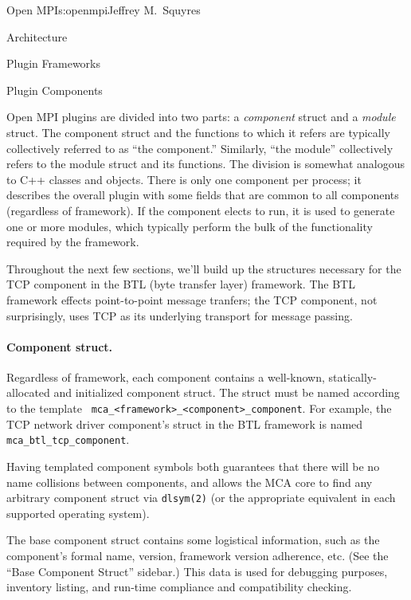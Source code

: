 \begin{aosachapter}{Open MPI}{s:openmpi}{Jeffrey M.\ Squyres}
\begin{aosasect1}{Architecture}
\begin{aosasect2}{Plugin Frameworks}
\end{aosasect2}


\begin{aosasect2}{Plugin Components}

Open MPI plugins are divided into two parts: a \emph{component}
struct and a \emph{module} struct.
%
The component struct and the functions to which it refers are
typically collectively referred to as ``the component.''  Similarly,
``the module'' collectively refers to the module struct and its
functions.
%
The division is somewhat analogous to C++ classes and objects.
%
There is only one component per process; it describes the overall
plugin with some fields that are common to all components (regardless
of framework).
%
If the component elects to run, it is used to generate one or more
modules, which typically perform the bulk of the functionality
required by the framework.

Throughout the next few sections, we'll build up the structures
necessary for the TCP component in the BTL (byte transfer layer)
framework.  The BTL framework effects point-to-point message tranfers;
the TCP component, not surprisingly, uses TCP as its underlying
transport for message passing.


\paragraph{Component struct.} 

Regardless of framework, each component contains a well-known,
statically-allocated and initialized component struct.  
%
The struct must be named according to the template {\tt
  mca\_\-<framework>\_\-<component>\_\-component}.  For example, the
TCP network driver component's struct in the BTL framework is named
{\tt mca\_\-btl\_\-tcp\_\-component}.

Having templated component symbols both guarantees that there will be
no name collisions between components, and allows the MCA core to find
any arbitrary component struct via {\tt dlsym(2)} (or the appropriate
equivalent in each supported operating system).

The base component struct contains some logistical information, such
as the component's formal name, version, framework version adherence,
etc.  (See the ``Base Component Struct'' sidebar.)
%
This data is used for debugging purposes, inventory listing, and
run-time compliance and compatibility checking.


\end{aosasect2}
\end{aosasect1}
\end{aosachapter}
